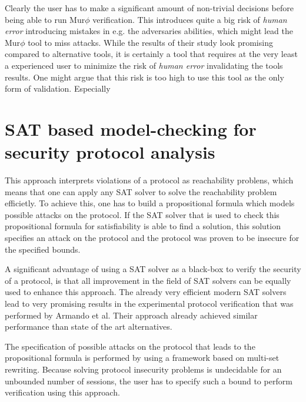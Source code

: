 \documentclass[a4paper,UKenglish]{lipics-v2018}
\def\murphi{Mur$\phi$ }
\begin{document}
Clearly the user has to make a significant amount of non-trivial decisions before being able to run \murphi verification. This introduces quite a big risk of \textit{human error} introducing mistakes in e.g. the adversaries abilities, which might lead the \murphi tool to miss attacks. While the results of their study look promising compared to alternative tools, it is certainly a tool that requires at the very least a experienced user to minimize the risk of \textit{human error} invalidating the tools results. One might argue that this risk is too high to use this tool as the only form of validation. Especially






\section{SAT based model-checking for security protocol analysis}

This approach interprets violations of a protocol as reachability problens, which means that one can apply any SAT solver to solve the reachability problem efficietly. To achieve this, one has to build a propositional formula which models possible attacks on the protocol. If the SAT solver that is used to check this propositional formula for satisfiability is able to find a solution, this solution specifies an attack on the protocol and the protocol was proven to be insecure for the specified bounds.\cite{sat}

A significant advantage of using a SAT solver as a black-box to verify the security of a protocol, is that all improvement in the field of SAT solvers can be equally used to enhance this approach. The already very efficient modern SAT solvers lead to very promising results in the experimental protocol verification that was performed by Armando et al. Their approach already achieved similar performance than state of the art alternatives.
\cite{sat}

The specification of possible attacks on the protocol that leads to the propositional formula is performed by using a framework based on multi-set rewriting. Because solving protocol insecurity problems is undecidable for an unbounded number of sessions, the user has to specify such a bound to perform verification using this approach.
\cite{sat}
\end{document}
